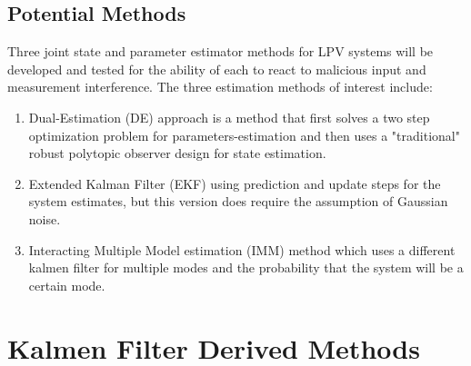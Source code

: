 \documentclass[]{article}
\begin{document}
\subsection{Potential Methods}
Three joint state and parameter estimator methods for LPV systems will be developed and tested for the ability of each to react to malicious input and measurement interference.
The three estimation methods of interest 
include:
\begin{enumerate}
	\item Dual-Estimation (DE) approach is a method that first solves a two step optimization problem for parameters-estimation and then uses a "traditional" robust polytopic observer design for state estimation. \cite{beelen2017joint}
	\item Extended Kalman Filter (EKF) using prediction and update steps for the system estimates, but this version does require the assumption of Gaussian noise. \cite{ekf_param_est}
	\item Interacting Multiple Model estimation (IMM) method which uses a different kalmen filter for multiple modes and the probability that the system will be a certain mode.\cite{bar2004estimation}
\end{enumerate}

\newpage
\section{Kalmen Filter Derived Methods}
\end{document}
